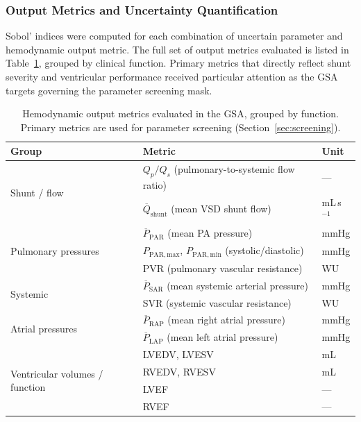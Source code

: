 \documentclass{article}
\begin{document}
\subsubsection{Output Metrics and Uncertainty Quantification}
\label{sec:gsa_outputs}

Sobol' indices were computed for each combination of uncertain
parameter and hemodynamic output metric. The full set of output
metrics evaluated is listed in Table~\ref{tab:gsa_outputs}, grouped
by clinical function. Primary metrics that directly reflect
shunt severity and ventricular performance received particular
attention as the GSA targets governing the parameter screening mask.

\begin{table}[ht]
\centering
\caption{Hemodynamic output metrics evaluated in the GSA,
         grouped by function. Primary metrics are used for
         parameter screening (Section~\ref{sec:screening}).}
\label{tab:gsa_outputs}
\begin{tabular}{lll}
\toprule
\textbf{Group} & \textbf{Metric} & \textbf{Unit} \\
\midrule
\multirow{2}{*}{Shunt / flow}
  & $Q_p/Q_s$ (pulmonary-to-systemic flow ratio) & --- \\
  & $\overline{Q}_\mathrm{shunt}$ (mean VSD shunt flow) & mL\,s$^{-1}$ \\
\midrule
\multirow{3}{*}{Pulmonary pressures}
  & $\overline{P}_\mathrm{PAR}$ (mean PA pressure) & mmHg \\
  & $P_\mathrm{PAR,max}$, $P_\mathrm{PAR,min}$ (systolic/diastolic) & mmHg \\
  & PVR (pulmonary vascular resistance) & WU \\
\midrule
\multirow{2}{*}{Systemic}
  & $\overline{P}_\mathrm{SAR}$ (mean systemic arterial pressure) & mmHg \\
  & SVR (systemic vascular resistance) & WU \\
\midrule
\multirow{2}{*}{Atrial pressures}
  & $\overline{P}_\mathrm{RAP}$ (mean right atrial pressure) & mmHg \\
  & $\overline{P}_\mathrm{LAP}$ (mean left atrial pressure)  & mmHg \\
\midrule
\multirow{4}{*}{Ventricular volumes / function}
  & LVEDV, LVESV & mL \\
  & RVEDV, RVESV & mL \\
  & LVEF & --- \\
  & RVEF & --- \\
\bottomrule
\end{tabular}
\end{table}
\end{document}
